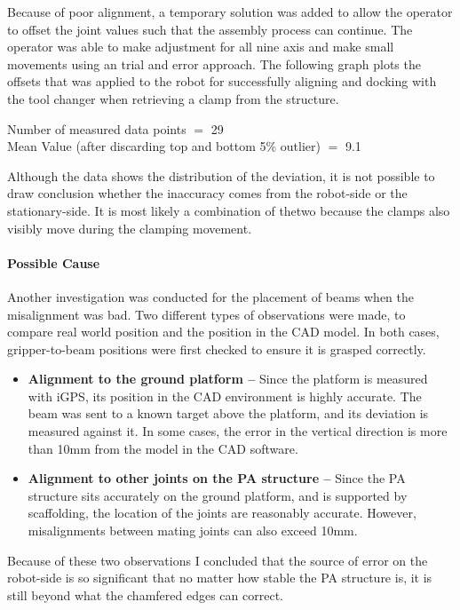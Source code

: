 {Because of poor alignment, a temporary solution was added to allow the operator to offset the joint values such that the assembly process can continue. The operator was able to make adjustment for all nine axis and make small movements using an trial and error approach. The following graph plots the offsets that was applied to the robot for successfully aligning and docking with the tool changer when retrieving a clamp from the structure.



{\footnotesize Number of measured data points $=$ 29 \\ Mean Value (after discarding top and bottom 5$\%$ outlier) $=$ 9.1}

Although the data shows the distribution of the deviation, it is not possible to draw conclusion whether the inaccuracy comes from the robot-side or the stationary-side. It is most likely a combination of thetwo because the clamps also visibly move during the clamping movement. 

\paragraph{Possible Cause}

Another investigation was conducted for the placement of beams when the misalignment was bad. Two different types of observations were made, to compare real world position and the position in the CAD model. In both cases, gripper-to-beam positions were first checked to ensure it is grasped correctly.

\begin{itemize}
	\item \textbf{Alignment to the ground platform --} Since the platform is measured with iGPS, its position in the CAD environment is highly accurate. The beam was sent to a known target above the platform, and its deviation is measured against it. In some cases, the error in the vertical direction is more than 10mm from the model in the CAD software. 

	\item \textbf{Alignment to other joints on the PA structure --} Since the PA structure sits accurately on the ground platform, and is supported by scaffolding, the location of the joints are reasonably accurate. However, misalignments between mating joints can also exceed 10mm. 

\end{itemize}
Because of these two observations I concluded that the source of error on the robot-side is so significant that no matter how stable the PA structure is, it is still beyond what the chamfered edges can correct. 

}
